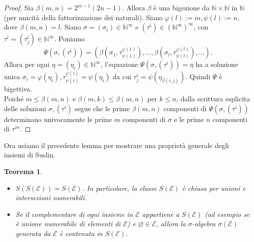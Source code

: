 \documentclass[a4paper, twoside,openright]{article}
\newcommand{\<}{\langle}
\renewcommand{\>}{\rangle}
\newtheorem{teo}{Teorema}[]
\begin{document}
\begin{proof}
	Sia $\beta(m, n)=2^{m-1}(2 n-1)$. Allora $\beta$ è una bigezione da $\mathbb{N} \times \mathbb{N}$ in $\mathbb{N}$ (per unicità della fattorizzazione dei naturali). Siano $\varphi(l):=m, \psi(l):=n$, dove $\beta(m, n)=l$. Siano $\sigma=\left(\sigma_{i}\right) \in \mathbb{N}^{\infty}$ e $\left(\tau^{i}\right) \in\left(\mathbb{N}^{\infty}\right)^{\infty}$, con $\tau^{i}=\left(\tau_{j}^{i}\right) \in \mathbb{N}^{\infty}$. Poniamo
	$$
	\Psi\left(\sigma,\left(\tau^{i}\right)\right)=\left(\beta\left(\sigma_{1}, \tau_{\psi(1)}^{\varphi(1)}\right), \ldots, \beta\left(\sigma_{l}, \tau_{\psi(l)}^{\varphi(l)}\right), \ldots\right) .
	$$
	Allora per ogni $\eta=\left(\eta_{i}\right) \in \mathbb{N}^{\infty}$, l'equazione $\Psi\left(\sigma,\left(\tau^{i}\right)\right)=\eta$ ha a soluzione unica $\sigma_{i}=\varphi\left(\eta_{i}\right),  \tau_{\psi(i)}^{\varphi(i)}=\psi(\eta_i)$ da cui $\tau_{j}^{i}=\psi\left(\eta_{\beta(i, j)}\right)$. Quindi $\Psi$ è bigettiva.\\
	Poiché $m \leq \beta(m, n)$ e $\beta(m, k) \leq \beta(m, n)$ per $k \leq n$, dalla scrittura esplicita delle soluzioni $\sigma, (\tau^i)$ segue che le prime $\beta(m, n)$ componenti di $\Psi\left(\sigma,\left(\tau^{i}\right)\right)$ determinano univocamente le prime $m$ componenti di $\sigma$ e le prime $n$ componenti di $\tau^{m}$.
	
\end{proof}

Ora usiamo il precedente lemma per mostrare una proprietà generale degli insiemi di Suslin.\\

\begin{teo} \label{SE}
	\hfill
	\begin{itemize}
		\item $S(S(\mathcal{E}))=S(\mathcal{E})$. In particolare, la classe $S(\mathcal{E})$ è chiusa per unioni e intersezioni numerabili.
		\item Se il complementare di ogni insieme in $\mathcal{E}$ appartiene a $S(\mathcal{E})$ (ad esempio se è unione numerabile di elementi di $\mathcal{E}$) e $\varnothing \in \mathcal{E}$, allora la $\sigma$-algebra $\sigma(\mathcal{E})$ generata da $\mathcal{E}$ è contenuta in $S(\mathcal{E}).$
	\end{itemize}
\end{teo}
\end{document}
